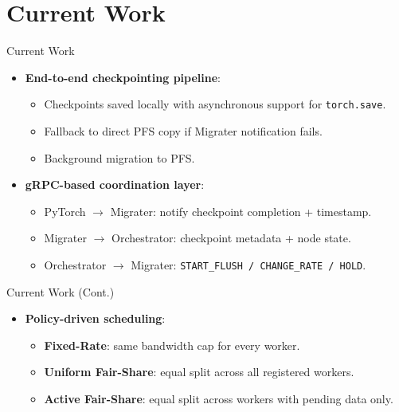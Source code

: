 \documentclass[handout]{beamer}
\begin{document}
\section{Current Work}

\begin{frame}{Current Work}
    \begin{itemize}

        \item \textbf{End-to-end checkpointing pipeline}:
        \begin{itemize}
            \item Checkpoints saved locally with asynchronous support for \texttt{torch.save}.
            \item Fallback to direct PFS copy if Migrater notification fails.
            \item Background migration to PFS.
        \end{itemize}

        \item \textbf{gRPC-based coordination layer}:
        \begin{itemize}
            \item PyTorch $\rightarrow$ Migrater: notify checkpoint completion + timestamp.
            \item Migrater $\rightarrow$ Orchestrator: checkpoint metadata + node state.
            \item Orchestrator $\rightarrow$ Migrater: \texttt{START\_FLUSH / CHANGE\_RATE / HOLD}.
        \end{itemize}
    \end{itemize}
\end{frame}

\begin{frame}{Current Work (Cont.)}
    \begin{itemize}

        \item \textbf{Policy-driven scheduling}:
        \begin{itemize}
            \small
            \item \textbf{Fixed-Rate}: same bandwidth cap for every worker.
            \item \textbf{Uniform Fair-Share}: equal split across all registered workers.
            \item \textbf{Active Fair-Share}: equal split across workers with pending data only.
        \end{itemize}
    \end{itemize}
\end{frame}
\end{document}
